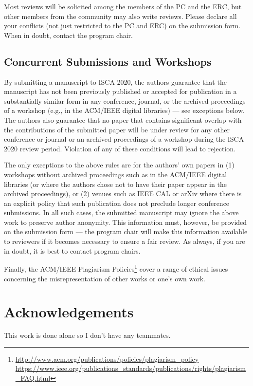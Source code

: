 \documentclass[conference]{IEEEtran}
\begin{document}
Most reviews will be solicited among the members of the PC and the ERC, but other
members from the community may also write reviews. Please declare all
your conflicts (not just restricted to the PC and ERC) on the
submission form. When in doubt, contact the program chair. 


\subsection{Concurrent Submissions and Workshops}
By submitting a manuscript to ISCA 2020, the authors guarantee that
the manuscript has not been previously published or accepted for
publication in a substantially similar form in any conference,
journal, or the archived proceedings of a workshop (e.g., in the
ACM/IEEE digital libraries) --- see exceptions below. The authors also
guarantee that no paper that contains significant overlap with the
contributions of the submitted paper will be under review for any
other conference or journal or an archived proceedings of a workshop
during the ISCA 2020 review period. Violation of any of these
conditions will lead to rejection. 

The only exceptions to the above rules are for the authors' own papers
in (1) workshops without archived proceedings such as in the ACM/IEEE
digital libraries (or where the authors chose not to have their paper
appear in the archived proceedings), or (2) venues such as IEEE CAL or
arXiv where there is an explicit policy that such publication does not
preclude longer conference submissions.  In all such cases, the
submitted manuscript may ignore the above work to preserve author
anonymity. This information must, however, be provided on the
submission form --- the program chair will make this information available
to reviewers if it becomes necessary to ensure a fair review.  As
always, if you are in doubt, it is best to contact program chairs. 


Finally, the ACM/IEEE Plagiarism Policies\footnote{\url{http://www.acm.org/publications/policies/plagiarism_policy}\\
\url{https://www.ieee.org/publications_standards/publications/rights/plagiarism_FAQ.html}}
cover a range of ethical issues concerning the misrepresentation of
other works or one's own work. 


\section*{Acknowledgements}
This work is done alone so I don't have any teammates.





\end{document}
